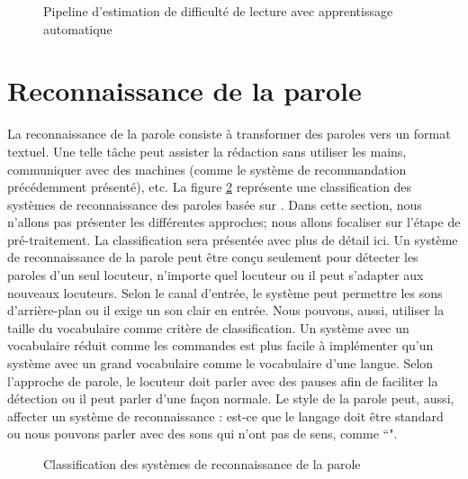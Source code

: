 \documentclass{KodeBook}
\begin{document}
\begin{figure}[!ht]
	\centering
	\caption[Pipeline d'estimation de difficulté de lecture avec apprentissage automatique]{Pipeline d'estimation de difficulté de lecture avec apprentissage automatique \cite{2014-collins}}
	\label{fig:lisibilite-collins}
\end{figure}


\section{Reconnaissance de la parole}

La reconnaissance de la parole consiste à transformer des paroles vers un format textuel. 
Une telle tâche peut assister la rédaction sans utiliser les mains, communiquer avec des machines (comme le système de recommandation précédemment présenté), etc. 
La figure \ref{fig:asr-classif} représente une classification des systèmes de reconnaissance des paroles basée sur \cite{2020-malik-al}.
Dans cette section, nous n'allons pas présenter les différentes approches; nous allons focaliser sur l'étape de pré-traitement.
La classification sera présentée avec plus de détail ici.
Un système de reconnaissance de la parole peut être conçu seulement pour détecter les paroles d'un seul locuteur, n'importe quel locuteur ou il peut s'adapter aux nouveaux locuteurs.
Selon le canal d'entrée, le système peut permettre les sons d'arrière-plan ou il exige un son clair en entrée.  
Nous pouvons, aussi, utiliser la taille du vocabulaire comme critère de classification.
Un système avec un vocabulaire réduit comme les commandes est plus facile à implémenter qu'un système avec un grand vocabulaire comme le vocabulaire d'une langue.
Selon l'approche de parole, le locuteur doit parler avec des pauses afin de faciliter la détection ou il peut parler d'une façon normale.
Le style de la parole peut, aussi, affecter un système de reconnaissance : est-ce que le langage doit être standard ou nous pouvons parler avec des sons qui n'ont pas de sens, comme ``".

\begin{figure}[!ht]
	\centering
	\caption{Classification des systèmes de reconnaissance de la parole}
	\label{fig:asr-classif}
\end{figure}
\end{document}
